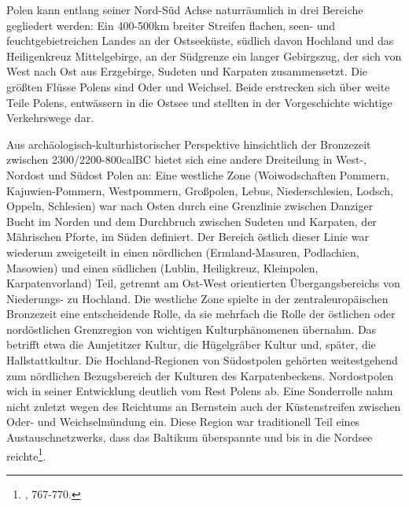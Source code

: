\documentclass[openany,twoside,twocolumn]{book}
\let\rmarkdownfootnote\footnote%
\def\footnote{\protect\rmarkdownfootnote}
\begin{document}
Polen kann entlang seiner Nord-Süd Achse naturräumlich in drei Bereiche
gegliedert werden: Ein 400-500km breiter Streifen flachen, seen- und
feuchtgebietreichen Landes an der Ostseeküste, südlich davon Hochland
und das Heiligenkreuz Mittelgebirge, an der Südgrenze ein langer
Gebirgszug, der sich von West nach Ost aus Erzgebirge, Sudeten und
Karpaten zusammensetzt. Die größten Flüsse Polens sind Oder und
Weichsel. Beide erstrecken sich über weite Teile Polens, entwässern in
die Ostsee und stellten in der Vorgeschichte wichtige Verkehrswege dar.

Aus archäologisch-kulturhistorischer Perspektive hinsichtlich der
Bronzezeit zwischen 2300/2200-800calBC bietet sich eine andere
Dreiteilung in West-, Nordost und Südost Polen an: Eine westliche Zone
(Woiwodschaften Pommern, Kajuwien-Pommern, Westpommern, Großpolen,
Lebus, Niederschlesien, Lodsch, Oppeln, Schlesien) war nach Osten durch
eine Grenzlinie zwischen Danziger Bucht im Norden und dem Durchbruch
zwischen Sudeten und Karpaten, der Mährischen Pforte, im Süden
definiert. Der Bereich östlich dieser Linie war wiederum zweigeteilt in
einen nördlichen (Ermland-Masuren, Podlachien, Masowien) und einen
südlichen (Lublin, Heiligkreuz, Kleinpolen, Karpatenvorland) Teil,
getrennt am Ost-West orientierten Übergangsbereichs von Niederungs- zu
Hochland. Die westliche Zone spielte in der zentraleuropäischen
Bronzezeit eine entscheidende Rolle, da sie mehrfach die Rolle der
östlichen oder nordöstlichen Grenzregion von wichtigen Kulturphänomenen
übernahm. Das betrifft etwa die Aunjetitzer Kultur, die Hügelgräber
Kultur und, später, die Hallstattkultur. Die Hochland-Regionen von
Südostpolen gehörten weitestgehend zum nördlichen Bezugsbereich der
Kulturen des Karpatenbeckens. Nordostpolen wich in seiner Entwicklung
deutlich vom Rest Polens ab. Eine Sonderrolle nahm nicht zuletzt wegen
des Reichtums an Bernstein auch der Küstenstreifen zwischen Oder- und
Weichselmündung ein. Diese Region war traditionell Teil eines
Austauschnetzwerks, dass das Baltikum überspannte und bis in die Nordsee
reichte\footnote{\textcite{czebreszuk_bronze_2013}, 767-770.}.
\end{document}
